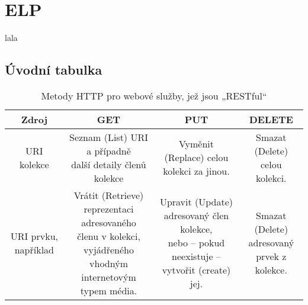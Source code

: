 \section{ELP}
lala

\subsection{Úvodní tabulka}


\begin{table}[h!]
\begin{adjustbox}{width=1\textwidth}
\begin{tabular}{|c|c|c|c|}
\hline
{\bf Zdroj} & {\bf GET} & {\bf PUT}  & {\bf DELETE} \\
\hline
\hline
URI kolekce & \makecell{Seznam (List) URI a případně \\ další detaily členů kolekce} & Vyměnit (Replace) celou kolekci za jinou. & \makecell{Smazat (Delete) celou \\kolekci.} \\
\hline
URI prvku, například  & \makecell{Vrátit (Retrieve) reprezentaci adresovaného \\členu v kolekci, vyjádřeného \\ vhodným internetovým typem média.} & \makecell{Upravit (Update) adresovaný člen kolekce, \\ nebo – pokud neexistuje – vytvořit (create) jej.}  & \makecell{Smazat (Delete)\\ adresovaný prvek z \\ kolekce.} \\
\hline
\end{tabular}
\end{adjustbox}
\caption{Metody HTTP pro webové služby, jež jsou „RESTful“ } 
\end{table} 